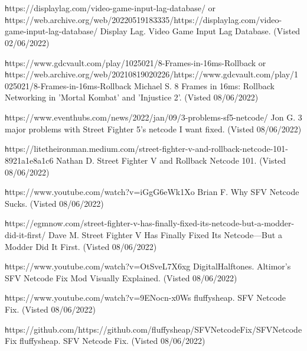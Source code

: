 \documentclass{entcs}
\begin{document}
\begin{thebibliography}{25}
 {\texttt https://displaylag.com/video-game-input-lag-database/} or {\texttt https://web.archive.org/web/20220519183335/https://displaylag.com/video-game-input-lag-database/} Display Lag. Video Game Input Lag Database. (Visted 02/06/2022)

 {\texttt https://www.gdcvault.com/play/1025021/8-Frames-in-16ms-Rollback} or {\texttt https://web.archive.org/web/20210819020226/https://www.gdcvault.com/play/1025021/8-Frames-in-16ms-Rollback} Michael S. 8 Frames in 16ms: Rollback Networking in 'Mortal Kombat' and 'Injustice 2'. (Visted 08/06/2022)

 {\texttt https://www.eventhubs.com/news/2022/jan/09/3-problems-sf5-netcode/} Jon G. 3 major problems with Street Fighter 5's netcode I want fixed. (Visted 08/06/2022)

 {\texttt https://litetheironman.medium.com/street-fighter-v-and-rollback-netcode-101-8921a1e8a1c6} Nathan D. Street Fighter V and Rollback Netcode 101. (Visted 08/06/2022)

 {\texttt https://www.youtube.com/watch?v=iGgG6eWk1Xo} Brian F. Why SFV Netcode Sucks. (Visted 08/06/2022)

 {\texttt https://egmnow.com/street-fighter-v-has-finally-fixed-its-netcode-but-a-modder-did-it-first/} Dave M. Street Fighter V Has Finally Fixed Its Netcode—But a Modder Did It First. (Visted 08/06/2022)

 {\texttt https://www.youtube.com/watch?v=OtSveL7X6xg} DigitalHalftones.  Altimor's SFV Netcode Fix Mod Visually Explained. (Visted 08/06/2022)

 {\texttt https://www.youtube.com/watch?v=9ENocn-x0Ws} fluffysheap. SFV Netcode Fix. (Visted 08/06/2022)

 {\texttt https://github.com/https://github.com/fluffysheap/SFVNetcodeFix/SFVNetcodeFix} fluffysheap. SFV Netcode Fix. (Visted 08/06/2022)

\end{thebibliography}
\end{document}
